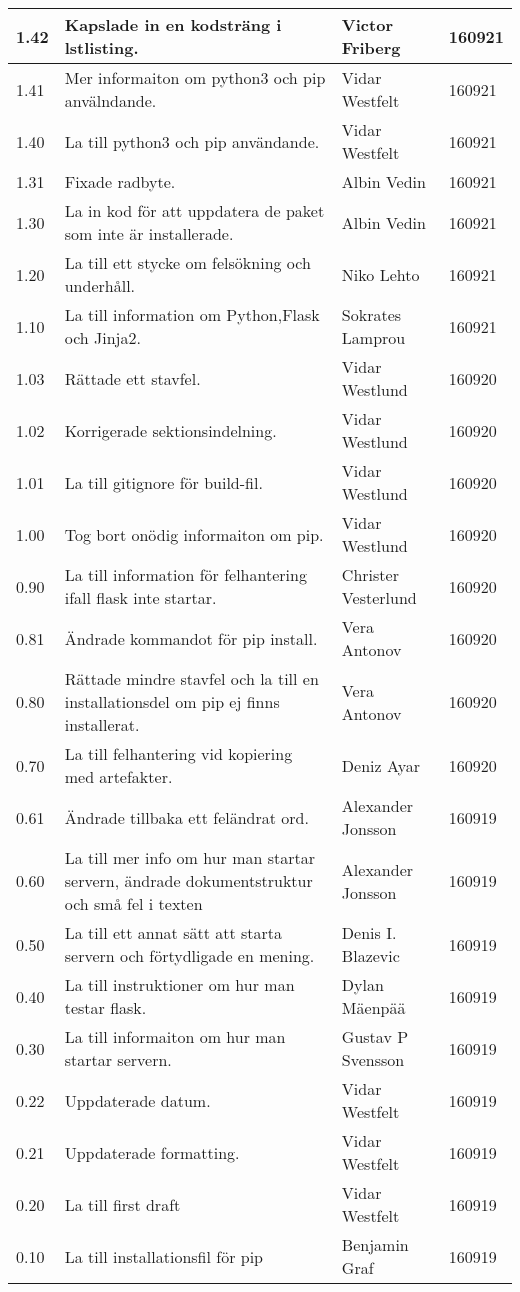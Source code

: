 \begin{longtable}{|l|X|l|l|}
1.42 & Kapslade in en kodsträng i lstlisting. & Victor Friberg & 160921 \\\hline
1.41 & Mer informaiton om python3 och pip anvälndande. & Vidar Westfelt & 160921 \\\hline
1.40 & La till python3 och pip användande. & Vidar Westfelt & 160921 \\\hline
1.31 & Fixade radbyte. & Albin Vedin & 160921 \\\hline
1.30 & La in kod för att uppdatera de paket som inte är installerade. & Albin Vedin & 160921 \\\hline
1.20 & La till ett stycke om felsökning och underhåll. & Niko Lehto & 160921 \\\hline
1.10 & La till information om Python,Flask och Jinja2. & Sokrates Lamprou & 160921 \\\hline
1.03 & Rättade ett stavfel. & Vidar Westlund & 160920 \\\hline
1.02 & Korrigerade sektionsindelning. & Vidar Westlund & 160920 \\\hline
1.01 & La till gitignore för build-fil. & Vidar Westlund & 160920 \\\hline
1.00 & Tog bort onödig informaiton om pip. & Vidar Westlund & 160920 \\\hline
0.90 & La till information för felhantering ifall flask inte startar. & Christer Vesterlund & 160920 \\\hline
0.81 & Ändrade kommandot för pip install. & Vera Antonov & 160920 \\\hline
0.80 & Rättade mindre stavfel och la till en installationsdel om pip ej finns installerat. & Vera Antonov & 160920 \\\hline
0.70 & La till felhantering vid kopiering med artefakter. & Deniz Ayar & 160920 \\\hline
0.61 & Ändrade tillbaka ett feländrat ord. & Alexander Jonsson & 160919 \\\hline
0.60 & La till mer info om hur man startar servern, ändrade dokumentstruktur och små fel i texten & Alexander Jonsson & 160919\\\hline
0.50 & La till ett annat sätt att starta servern och förtydligade en mening. & Denis I. Blazevic & 160919\\\hline
0.40 & La till instruktioner om hur man testar flask. & Dylan Mäenpää & 160919 \\\hline
0.30 & La till informaiton om hur man startar servern. & Gustav P Svensson & 160919 \\\hline
0.22 & Uppdaterade datum. & Vidar Westfelt & 160919 \\\hline
0.21 & Uppdaterade formatting. & Vidar Westfelt & 160919 \\\hline
0.20 & La till first draft & Vidar Westfelt & 160919 \\\hline
0.10 & La till installationsfil för pip & Benjamin Graf & 160919 \\\hline
\end{longtable}